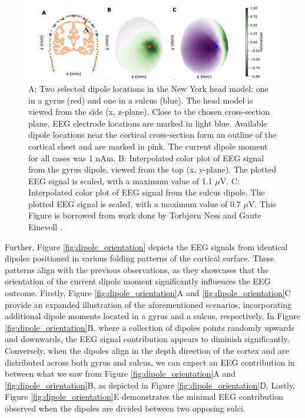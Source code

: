 \documentclass[a4paper, UKenglish, 11pt]{uiomaster}
\begin{document}
\begin{figure}[!htb]
    \centering
    \includegraphics[width=\linewidth]{figures/gyrus_and_sulcus_EEG.png}
    \caption{A: Two selected dipole locations in the New York head model: one in a gyrus (red) and one in a sulcus (blue). The head model is viewed from the side (x, z-plane). Close to the chosen cross-section plane, EEG electrode locations are marked in light blue. Available dipole locations near the cortical cross-section form an outline of the cortical sheet and are marked in pink. The current dipole moment for all cases was 1 nAm. B: Interpolated color plot of EEG signal from the gyrus dipole, viewed from the top (x, y-plane). The plotted EEG signal is scaled, with a maximum value of 1.1 $\mu$V. C: Interpolated color plot of EEG signal from the sulcus dipole. The plotted EEG signal is scaled, with a maximum value of 0.7 $\mu$V. This Figure is borrowed from work done by Torbjørn Ness and Gaute Einevoll \cite{naess2021biophysically}.}
    \label{fig:gyrus_and_sulcus_EEG}
\end{figure}

Further, Figure \ref{fig:dipole_orientation} depicts the EEG signals from identical dipoles positioned in various folding patterns of the cortical surface. These patterns align with the previous observations, as they showcases that the orientation of the current dipole moment significantly influences the EEG outcome. Firstly, Figure \ref{fig:dipole_orientation}A and \ref{fig:dipole_orientation}C provide an expanded illustration of the aforementioned scenarios, incorporating additional dipole moments located in a gyrus and a sulcus, respectively. In Figure \ref{fig:dipole_orientation}B, where a collection of dipoles points randomly upwards and downwards, the EEG signal contribution appears to diminish significantly. Conversely, when the dipoles align in the depth direction of the cortex and are distributed across both gyrus and sulcus, we can expect an EEG contribution in between what we saw from Figure \ref{fig:dipole_orientation}A and \ref{fig:dipole_orientation}B, as depicted in Figure \ref{fig:dipole_orientation}D. Lastly, Figure \ref{fig:dipole_orientation}E demonstrates the minimal EEG contribution observed when the dipoles are divided between two opposing sulci.
\end{document}
